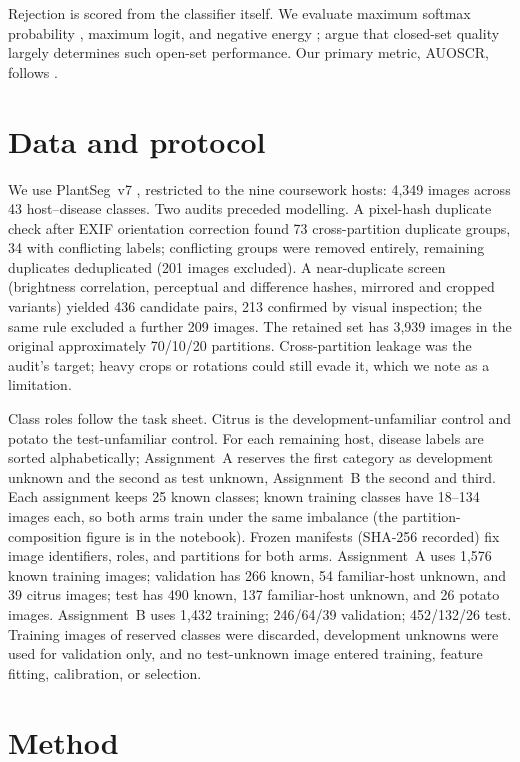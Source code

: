\documentclass[10pt,a4paper]{article}
\begin{document}
Rejection is scored from the classifier itself. We evaluate maximum softmax probability
\citep{hendrycks2017baseline}, maximum logit, and negative energy \citep{liu2020energy}; \citet{vaze2022openset}
argue that closed-set quality largely determines such open-set performance. Our primary metric, AUOSCR,
follows \citet{dhamija2018reducing}.

\section{Data and protocol}
We use PlantSeg~v7 \citep{wei2025plantseg,wei2026plantseg}, restricted to the nine coursework hosts:
4{,}349 images across 43 host--disease classes. Two audits preceded modelling. A pixel-hash duplicate
check after EXIF orientation correction found 73 cross-partition duplicate groups, 34 with conflicting
labels; conflicting groups were removed entirely, remaining duplicates deduplicated (201 images
excluded). A near-duplicate screen (brightness correlation, perceptual and difference hashes, mirrored
and cropped variants) yielded 436 candidate pairs, 213 confirmed by visual inspection; the same rule
excluded a further 209 images. The retained set has 3{,}939 images in the original approximately
70/10/20 partitions. Cross-partition leakage was the audit's target; heavy crops or rotations could still
evade it, which we note as a limitation.

Class roles follow the task sheet. Citrus is the development-unfamiliar control and potato the
test-unfamiliar control. For each remaining host, disease labels are sorted alphabetically;
Assignment~A reserves the first category as development unknown and the second as test unknown,
Assignment~B the second and third. Each assignment keeps 25 known classes; known training classes
have 18--134 images each, so both arms train under the same imbalance (the partition-composition figure
is in the notebook). Frozen manifests (SHA-256 recorded) fix image identifiers, roles, and partitions for
both arms. Assignment~A uses 1{,}576 known training images; validation has 266 known, 54 familiar-host
unknown, and 39 citrus images; test has 490 known, 137 familiar-host unknown, and 26 potato images.
Assignment~B uses 1{,}432 training; 246/64/39 validation; 452/132/26 test. Training images of reserved
classes were discarded, development unknowns were used for validation only, and no test-unknown image
entered training, feature fitting, calibration, or selection.

\section{Method}
\end{document}
